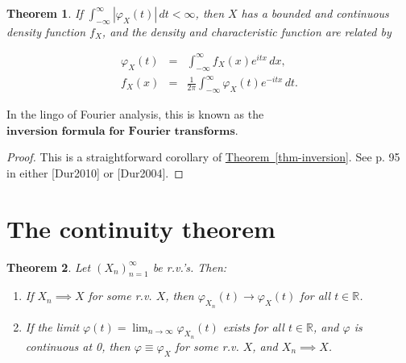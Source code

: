 \documentclass[11pt]{report}
\newcommand{\R}{\mathbb{R}}
\theoremstyle{plain}
\newtheorem{thm}{Theorem}[chapter]
\theoremstyle{definition}
\begin{document}
\begin{thm}
If
$\int_{-\infty}^\infty |\varphi_X(t)|\,dt < \infty$,
then $X$ has a bounded and continuous density
function $f_X$, and the density and characteristic
function are related by

\begin{eqnarray*}
\varphi_X(t) &=& \int_{-\infty}^\infty f_X(x) e^{itx}\,dx,  \\
f_X(x) &=& \frac{1}{2\pi} \int_{-\infty}^\infty \varphi_X(t) e^{-itx}\,dt.
\end{eqnarray*}

\end{thm}

\noindent In the lingo of Fourier analysis, this is known as
the
$\textbf{inversion formula for Fourier transforms}$.

\begin{proof}
This is a straightforward corollary of \texorpdfstring{\hyperref[thm-inversion]{Theorem~\ref*{thm-inversion}}}{Theorem}. See p. 95 in either [Dur2010] or
[Dur2004].
\end{proof}

\section{The continuity theorem}

\begin{thm}
\label{thm-continuity}
Let $(X_n)_{n=1}^\infty$ be r.v.'s. Then:

\begin{enumerate}[label=(\roman*)]
\item If $X_n \implies X$ for some r.v. $X$, then
$\varphi_{X_n}(t)\to \varphi_X(t)$ for all $t\in\R$.

\item If the limit
$\varphi(t) = \lim_{n\to\infty} \varphi_{X_n}(t)$
exists for all $t\in\R$, and $\varphi$ is continuous
at 0, then $\varphi\equiv \varphi_X$ for some r.v.
$X$, and $X_n \implies X$.
\end{enumerate}

\end{thm}
\end{document}
